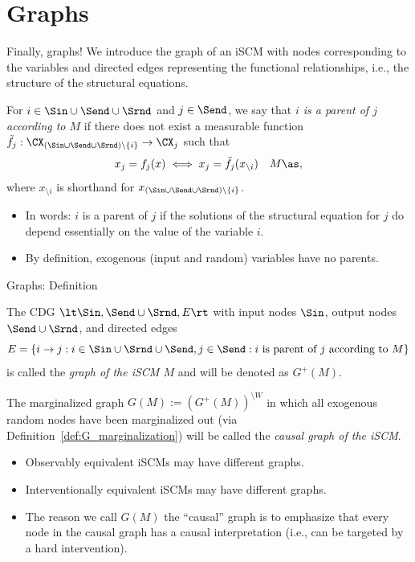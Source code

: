 \part{Graphs}
\frame{\partpage}

\begin{frame}{Finally, graphs!}
  We introduce the graph of an iSCM with nodes corresponding to the variables and directed edges representing the functional relationships, i.e., the structure of the structural equations.
  
  \begin{Def}[\ref{def:scm_parent}]
  For $i \in \Sin \cup \Send \cup \Srnd$ and $j \in \Send$, we say that
  \emph{$i$ is a parent of $j$ according to $M$} if there does not exist a measurable function
  $\tilde f_j : \CX_{(\Sin\cup\Send\cup\Srnd) \setminus \{i\}} \to \CX_j$
  such that
  $$x_j = f_j(x) \iff x_j = \tilde f_j(x_{\setminus i})\quad M\as,$$
  where $x_{\setminus i}$ is shorthand for $x_{(\Sin\cup\Send\cup\Srnd)\setminus\{i\}}$.
\end{Def}
  \begin{itemize}
    \item In words: $i$ is a parent of $j$ if the solutions of the structural equation for $j$ do depend essentially on the value of the variable $i$.
    \item By definition, exogenous (input and random) variables have no parents.
  \end{itemize}
\end{frame}

\begin{frame}{Graphs: Definition}
  \begin{Def}[\ref{def:scm_graph}]
  The CDG $\lt \Sin, \Send \cup \Srnd, E \rt$ with
  input nodes $\Sin$, output nodes $\Send\cup\Srnd$, and
  directed edges
  $$E = \{i \to j : i \in \Sin\cup\Srnd\cup\Send, j\in\Send: \text{$i$ is parent of $j$ according to $M$}\}$$
  is called the \emph{graph of the iSCM $M$} and will be denoted as $G^+(M)$.
  
  The marginalized graph $G(M) := (G^+(M))^{\setminus W}$ in which all exogenous random nodes have been marginalized out (via Definition~\ref{def:G_marginalization}) will be called the \emph{causal graph of the iSCM}.
\end{Def}
  \begin{itemize}
    \item Observably equivalent iSCMs may have different graphs.
    \item Interventionally equivalent iSCMs may have different graphs.
    \item The reason we call $G(M)$ the ``causal'' graph is to emphasize that every node in the causal graph has a causal interpretation (i.e., can be targeted by a hard intervention).
  \end{itemize}
\end{frame}

